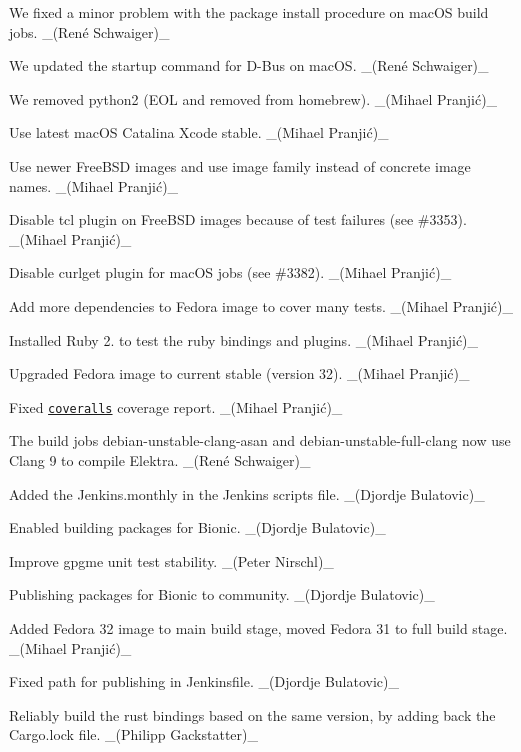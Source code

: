 \begin{DoxyItemize}
\item We fixed a minor problem with the package install procedure on mac\+OS build jobs. \+\_\+(René Schwaiger)\+\_\+
\item We updated the startup command for D-\/\+Bus on mac\+OS. \+\_\+(René Schwaiger)\+\_\+
\item We removed python2 (E\+OL and removed from homebrew). \+\_\+(Mihael Pranjić)\+\_\+
\item Use latest mac\+OS Catalina Xcode stable. \+\_\+(Mihael Pranjić)\+\_\+
\item Use newer Free\+B\+SD images and use image family instead of concrete image names. \+\_\+(Mihael Pranjić)\+\_\+
\item Disable tcl plugin on Free\+B\+SD images because of test failures (see \#3353). \+\_\+(Mihael Pranjić)\+\_\+
\item Disable curlget plugin for mac\+OS jobs (see \#3382). \+\_\+(Mihael Pranjić)\+\_\+
\item Add more dependencies to Fedora image to cover many tests. \+\_\+(Mihael Pranjić)\+\_\+
\item Installed Ruby 2. to test the ruby bindings and plugins. \+\_\+(Mihael Pranjić)\+\_\+
\item Upgraded Fedora image to current stable (version 32). \+\_\+(Mihael Pranjić)\+\_\+
\end{DoxyItemize}


\begin{DoxyItemize}
\item Fixed \href{https://coveralls.io/github/ElektraInitiative/libelektra}{\tt coveralls} coverage report. \+\_\+(Mihael Pranjić)\+\_\+
\item The build jobs {\ttfamily debian-\/unstable-\/clang-\/asan} and {\ttfamily debian-\/unstable-\/full-\/clang} now use Clang 9 to compile Elektra. \+\_\+(René Schwaiger)\+\_\+
\item Added the {\ttfamily Jenkins.\+monthly} in the Jenkins\textquotesingle{} scripts file. \+\_\+(\+Djordje Bulatovic)\+\_\+
\item Enabled building packages for Bionic. \+\_\+(\+Djordje Bulatovic)\+\_\+
\item Improve gpgme unit test stability. \+\_\+(\+Peter Nirschl)\+\_\+
\item Publishing packages for Bionic to community. \+\_\+(\+Djordje Bulatovic)\+\_\+
\item Added Fedora 32 image to main build stage, moved Fedora 31 to full build stage. \+\_\+(Mihael Pranjić)\+\_\+
\item Fixed path for publishing in Jenkinsfile. \+\_\+(\+Djordje Bulatovic)\+\_\+
\item Reliably build the rust bindings based on the same version, by adding back the {\ttfamily Cargo.\+lock} file. \+\_\+(\+Philipp Gackstatter)\+\_\+
\end{DoxyItemize}


